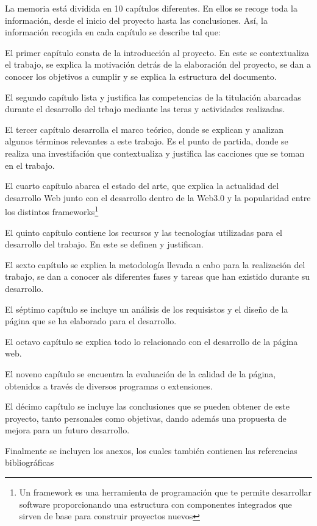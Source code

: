 La memoria está dividida en 10 capítulos diferentes. En ellos se recoge toda
la información, desde el inicio del proyecto hasta las conclusiones. Así, 
la información recogida en cada capítulo se describe tal que:

\-\hspace{1cm} El primer capítulo consta de la introducción al proyecto. En este se 
contextualiza el trabajo, se explica la motivación detrás de la elaboración 
del proyecto, se dan a conocer los objetivos a cumplir y se explica la 
estructura del documento.

\-\hspace{1cm} El segundo capítulo lista y justifica las competencias de la titulación
abarcadas durante el desarrollo del trbajo mediante las teras y actividades realizadas.

\-\hspace{1cm} El tercer capítulo desarrolla el marco teórico, donde se explican y 
analizan algunos términos relevantes a este trabajo. Es el punto de partida, 
donde se realiza una investifación que contextualiza y justifica las cacciones
que se toman en el trabajo.

\-\hspace{1cm} El cuarto capítulo abarca el estado del arte, que explica la 
actualidad del desarrollo Web junto con el desarrollo dentro de la Web3.0 y 
la popularidad entre los distintos frameworks\footnote{Un framework es una 
herramienta de programación que te permite desarrollar software proporcionando 
una estructura con componentes integrados que sirven de base para construir 
proyectos nuevos\cite{bootcampFramework}}

\-\hspace{1cm} El quinto capítulo contiene los recursos y las tecnologías 
utilizadas para el desarrollo del trabajo. En este se definen y justifican.

\-\hspace{1cm} El sexto capítulo se explica la metodología llevada a cabo 
para la realización del trabajo, se dan a conocer als diferentes fases y 
tareas que han existido durante su desarrollo.

\-\hspace{1cm} El séptimo capítulo se incluye un análisis de los requisistos y 
el diseño de la página que se ha elaborado para el desarrollo.

\-\hspace{1cm} El octavo capítulo se explica todo lo relacionado con el 
desarrollo de la página web.

\-\hspace{1cm} El noveno capítulo se encuentra la evaluación de la calidad de la página, 
obtenidos a través de diversos programas o extensiones.

\-\hspace{1cm} El décimo capítulo se incluye las conclusiones que se pueden obtener 
de este proyecto, tanto personales como objetivas, dando además una propuesta de mejora 
para un futuro desarrollo.

\-\hspace{1cm} Finalmente se incluyen los anexos, los cuales también contienen las 
referencias bibliográficas